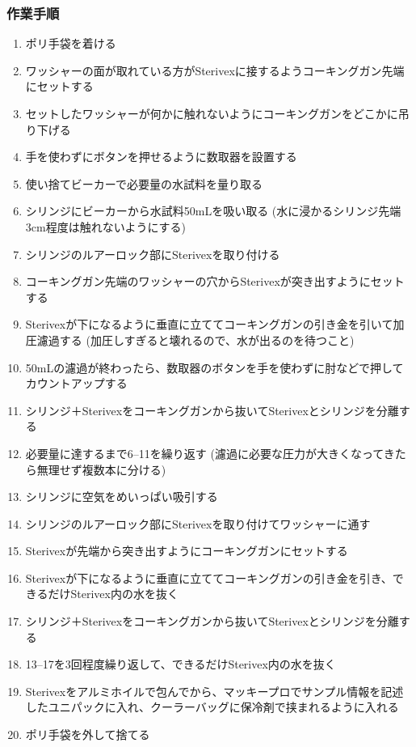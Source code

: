 \documentclass[titlepage,10pt,a4paper,uplatex]{jsbook}
\begin{document}
\subsubsection{作業手順}
\begin{enumerate}
\item ポリ手袋を着ける
\item ワッシャーの面が取れている方がSterivexに接するようコーキングガン先端にセットする
\item セットしたワッシャーが何かに触れないようにコーキングガンをどこかに吊り下げる
\item 手を使わずにボタンを押せるように数取器を設置する
\item 使い捨てビーカーで必要量の水試料を量り取る
\item シリンジにビーカーから水試料50mLを吸い取る (水に浸かるシリンジ先端3cm程度は触れないようにする)
\item シリンジのルアーロック部にSterivexを取り付ける
\item コーキングガン先端のワッシャーの穴からSterivexが突き出すようにセットする
\item Sterivexが下になるように垂直に立ててコーキングガンの引き金を引いて加圧濾過する (加圧しすぎると壊れるので、水が出るのを待つこと)
\item 50mLの濾過が終わったら、数取器のボタンを手を使わずに肘などで押してカウントアップする
\item シリンジ＋Sterivexをコーキングガンから抜いてSterivexとシリンジを分離する
\item 必要量に達するまで6--11を繰り返す (濾過に必要な圧力が大きくなってきたら無理せず複数本に分ける)
\item シリンジに空気をめいっぱい吸引する
\item シリンジのルアーロック部にSterivexを取り付けてワッシャーに通す
\item Sterivexが先端から突き出すようにコーキングガンにセットする
\item Sterivexが下になるように垂直に立ててコーキングガンの引き金を引き、できるだけSterivex内の水を抜く
\item シリンジ＋Sterivexをコーキングガンから抜いてSterivexとシリンジを分離する
\item 13--17を3回程度繰り返して、できるだけSterivex内の水を抜く
\item Sterivexをアルミホイルで包んでから、マッキープロでサンプル情報を記述したユニパックに入れ、クーラーバッグに保冷剤で挟まれるように入れる
\item ポリ手袋を外して捨てる
\end{enumerate}
\end{document}
